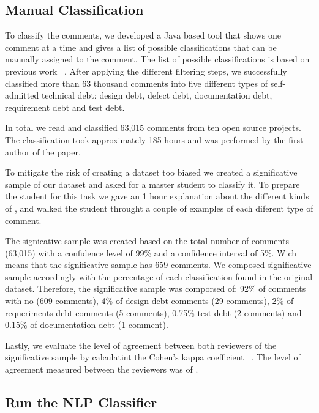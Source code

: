\subsection{Manual Classification} %
\label{sub:manual_classification}

To classify the comments, we developed a Java based tool that shows one comment at a time and gives a list of possible classifications that can be manually assigned to the comment. The list of possible classifications is based on previous work ~\cite{Alves2014MTD}. After applying the different filtering steps, we successfully classified more than 63 thousand comments into five different types of self-admitted technical debt: design debt, defect debt, documentation debt, requirement debt and test debt.

 In total we read and classified 63,015 comments from ten open source projects. The classification took approximately 185 hours and was performed by the first author of the paper.  

To mitigate the risk of creating a dataset too biased we created a significative sample of our dataset and asked for a master student to classify it. To prepare the student for this task we gave an 1 hour explanation about the different kinds of \SATD, and walked the student throught a couple of examples of each diferent type of \SATD comment. 

The signicative sample was created based on the total number of comments (63,015) with a confidence level of 99\% and a confidence interval of 5\%. Wich means that the significative sample has 659 comments. We composed significative sample accordingly with the percentage of each classification found in the original dataset. Therefore, the significative sample was comporsed of: 92\% of comments with no \SATD (609 comments), 4\% of design debt comments (29 comments), 2\% of requeriments debt comments (5 comments), 0.75\% test debt (2 comments) and 0.15\% of documentation debt (1 comment).

Lastly, we evaluate the level of agreement between both reviewers of the significative sample by calculatint the Cohen's kappa coefficient ~\cite{cohen1960coefficient}. The level of agreement measured between the reviewers was of \todo{}.   
 

\subsection{Run the NLP Classifier} %
\label{sub:run_the_nlp_classifier}

